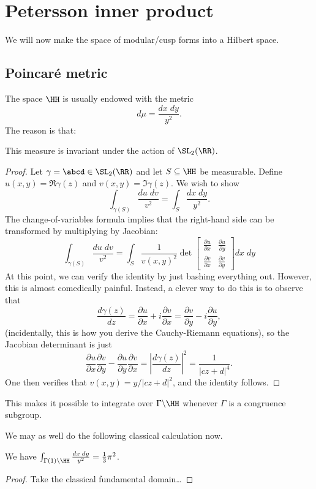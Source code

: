 \section{Petersson inner product}
We will now make the space of modular/cusp forms
into a Hilbert space.

\subsection{Poincar\'{e} metric}
The space $\HH$ is usually endowed with the metric
\[ d\mu = \frac{dx \; dy}{y^2}. \]
The reason is that:
\begin{proposition}
  This measure is invariant under the action of $\SL_2(\RR)$.
\end{proposition}
\begin{proof}
  Let $\gamma = \abcd \in \SL_2(\RR)$ and let $S \subseteq \HH$ be measurable.
  Define $u(x,y) = \Re \gamma(z)$ and $v(x,y) = \Im \gamma(z)$.
  We wish to show
  \[ \int_{\gamma(S)} \frac{du \; dv}{v^2} = \int_S \frac{dx \; dy}{y^2}. \]
  The change-of-variables formula implies that
  the right-hand side can be transformed by multiplying by Jacobian:
  \[ \int_{\gamma(S)} \frac{du \; dv}{v^2} = \int_{S}
    \frac{1}{v(x,y)^2}
    \det \begin{bmatrix}
      \frac{\partial u}{\partial x} & \frac{\partial u}{\partial y} \\
      \frac{\partial v}{\partial x} & \frac{\partial v}{\partial y}
    \end{bmatrix} dx \; dy
  \]
  At this point, we can verify the identity by just bashing everything out.
  However, this is almost comedically painful. Instead, a clever way to
  do this is to observe that
  \[\frac{d\gamma(z)}{dz}
    = \frac{\partial u}{\partial x} + i\frac{\partial v}{\partial x}
    = \frac{\partial v}{\partial y} - i\frac{\partial u}{\partial y}, \]
  (incidentally, this is how you derive the Cauchy-Riemann equations),
  so the Jacobian determinant is just
  \[ \frac{\partial u}{\partial x}\frac{\partial v}{\partial y}
    - \frac{\partial u}{\partial y}\frac{\partial v}{\partial x}
    = \left|\frac{d\gamma(z)}{dz}\right|^2
    = \frac{1}{|cz+d|^4}. \]
  One then verifies that $v(x,y) = y/|cz+d|^2$, and the identity follows.
\end{proof}
This makes it possible to integrate over $\Gamma \backslash \HH$
whenever $\Gamma$ is a congruence subgroup.

We may as well do the following classical calculation now.
\begin{proposition}
  We have $\int_{\Gamma(1) \backslash \HH} \frac{dx \; dy}{y^2} = \frac13\pi^2$.
\end{proposition}
\begin{proof}
  Take the classical fundamental domain\dots
\end{proof}


